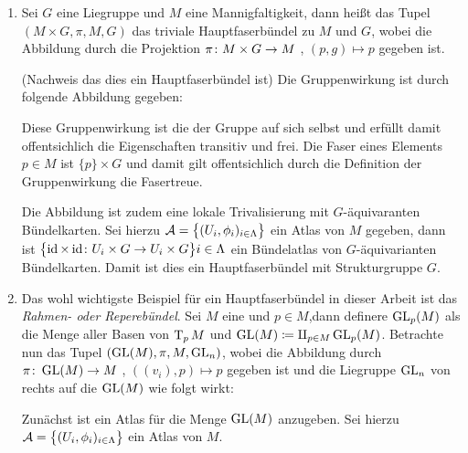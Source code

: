 \begin{Bsp}
	\begin{enumerate}[1)]
		\item Sei $G$ eine Liegruppe und $M$ eine Mannigfaltigkeit, dann heißt das Tupel $(M \times G, \pi, M, G)$ das triviale Hauptfaserbündel zu $M$ und $G$, wobei die Abbildung
		durch die Projektion $\pi \colon M \times G \rightarrow M$ , $(p,g) \mapsto p$ 
		gegeben ist. 
		\begin{smallproof}(Nachweis das dies ein Hauptfaserbündel ist)
		Die Gruppenwirkung ist durch folgende Abbildung gegeben:
		
		Diese Gruppenwirkung ist die der Gruppe auf sich selbst
		und erfüllt damit offentsichlich die Eigenschaften
		transitiv und frei. Die Faser eines Elements $p\in M$ 
		ist $\{p\}\times G$ und damit gilt offentsichlich
		durch die Definition der Gruppenwirkung die Fasertreue.
		
		Die Abbildung ist zudem eine lokale Trivalisierung mit
		$G$-äquivaranten Bündelkarten. Sei hierzu $\mathcal{A}=\bigl\{ (U_i,\phi_i)_{i \in \Lambda} \bigr\}$ ein
		Atlas von $M$ gegeben, dann ist $ \bigl\{ \operatorname{id}\times\operatorname{id} \colon U_i \times G \rightarrow U_i\times G \bigr\}{i \in \Lambda} $ ein Bündelatlas	von $G$-äquivarianten Bündelkarten.
		Damit ist dies ein Hauptfaserbündel mit Strukturgruppe $G$.
		\end{smallproof}
		
		\item Das wohl wichtigste Beispiel für ein Hauptfaserbündel in dieser
		Arbeit ist das \textit{Rahmen- oder Reperebündel}. Sei $M$ eine \mfg und $p \in M$,dann definere $\operatorname{GL}_p(M)$ als die Menge aller Basen von
		$\operatorname{T}_{p}M$ und $\operatorname{GL}(M) \coloneqq \amalg_{p \in M} \operatorname{GL}_p(M)$. 
		Betrachte nun das Tupel $(\operatorname{GL}(M),\pi,M,\operatorname{GL}_n)$, wobei die Abbildung
		durch $\pi \colon \operatorname{GL}(M) \rightarrow M$ , $((v_i),p) \mapsto p$ gegeben ist
		und die Liegruppe $\operatorname{GL}_n$ von rechts auf die \mfg $\operatorname{GL}(M)$ wie  folgt
		wirkt:
		\begin{center}
		\end{center}
		\begin{smallproof}
			Zunächst ist ein Atlas für die Menge $ \operatorname{GL}(M) $ anzugeben. Sei hierzu $\mathcal{A}=\bigl\{ (U_i,\phi_i)_{i\in \Lambda} \bigr\}$
			ein Atlas von $M$. 
			

\end{smallproof}
\end{enumerate}
\end{Bsp}
